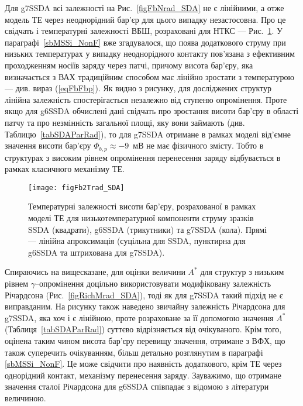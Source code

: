 Для g7SSDA всі залежності на Рис.~\ref{figFbNrad_SDA} не є лінійними, а отже модель ТЕ через неоднорідний бар'єр для цього випадку незастосовна.
Про це свідчать і температурні залежності ВБШ, розраховані для НТКС --- Рис.~\ref{figFb2Trad_SDA}.
У параграфі~\ref{sbMSSi_NonF} вже згадувалося, що поява додаткового струму при низьких температурах у випадку неоднорідного контакту
пов'язана з ефективним проходженням носіїв заряду через патчі, причому висота бар'єру, яка визначається з ВАХ традиційним способом має лінійно зростати з температурою
--- див. вираз (\ref{eqFbFbp}).
Як видно з рисунку, для досліджених структур лінійна залежність спостерігається незалежно від ступеню опромінення.
Проте якщо для g6SSDA обчислені дані свідчать про зростання висоти бар'єру в області патчу та про незмінність загальної площі, яку вони займають (див. Таблицю~\ref{tabSDAParRad}),
то для g7SSDA отримане в рамках моделі від'ємне значення висоти бар'єру $\Phi_{b,p}\approx-9$~мВ не має фізичного змісту.
Тобто в структурах з високим рівнем опромінення перенесення заряду відбувається в рамках класичного механізму ТЕ.



\begin{figure}
\center
\texttt{[image: figFb2Trad\_SDA]}
\caption{\label{figFb2Trad_SDA}
Температурні залежності висоти бар'єру, розрахованої в рамках моделі ТЕ
для низькотемпературної компоненти струму зразків SSDA (квадрати),
g6SSDA (трикутники) та g7SSDA (кола).
Прямі  --- лінійна апроксимація (суцільна для SSDA, пунктирна для g6SSDA та
штрихована для g7SSDA).
}%
\end{figure}

Спираючись на вищесказане, для оцінки величини $A^*$ для структур з низьким рівнем $\gamma$--опромінення доцільно використовувати
модифіковану залежність Річардсона (Рис.~\ref{figRichMrad_SDA}), тоді як для g7SSDA такий підхід не є виправданим.
На рисунку також наведено звичайну залежність Річардсона для g7SSDA, яка хоч і є лінійною,
проте розраховане за її допомогою значення $A^*$ (Таблиця~\ref{tabSDAParRad}) суттєво відрізняється від очікуваного.
Крім того, оцінена таким чином висота бар'єру перевищу значення, отримане з ВФХ, що також суперечить очікуванням,
більш детально розглянутим в параграфі \ref{sbMSSi_NonF}.
Це може свідчити про наявність додаткового, крім ТЕ через однорідний контакт,
механізму перенесення заряду.
Зауважимо, що отримане значення сталої Річардсона для g6SSDA співпадає з відомою з літератури величиною.

